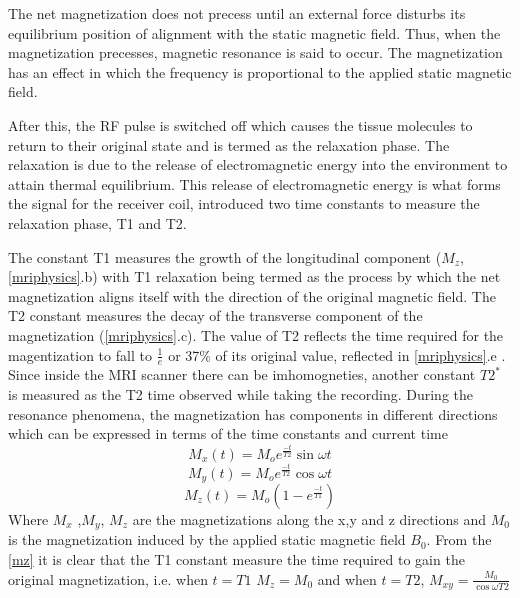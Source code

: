 \documentclass[msthesis.tex]{subfiles}
\begin{document}
The net magnetization does not precess until an external force disturbs its equilibrium position of alignment with the static magnetic field. Thus, when the magnetization precesses, magnetic resonance is said to occur. The magnetization has an effect in which the frequency is proportional to the applied static magnetic field.

After this, the RF pulse is switched off which causes the tissue molecules to return to their original state and is termed as the relaxation phase. The relaxation is due to the release of electromagnetic energy into the environment to attain thermal equilibrium. This release of electromagnetic energy is what forms the signal for the receiver coil, \cite{PhysRev.70.460} introduced two time constants to measure the relaxation phase, T1 and T2.

The constant T1 measures the growth of the longitudinal component ($M_z$, \autoref{mriphysics}.b) with T1 relaxation being termed as the process by which the net magnetization aligns itself with the direction of the original magnetic field. The T2 constant measures the decay of the transverse component of the magnetization (\autoref{mriphysics}.c). The value of T2 reflects the time required for the magentization to fall to $\frac{1}{e}$ or 37\% of its original value, reflected in \autoref{mriphysics}.e . Since inside the MRI scanner there can be imhomogneties, another constant $T2^*$ is measured as the T2 time observed while taking the recording.
During the resonance phenomena, the magnetization has components in different directions which can be expressed in terms of the time constants and current time
\begin{equation}
    M_x(t) = M_o e^{\frac{−t}{T2}} \sin{ \omega t}
    \label{mx}
\end{equation}
\begin{equation}
    M_y(t) = M_o e^{\frac{-t}{T2}} \cos{\omega {t}}
    \label{my}
\end{equation}
\begin{equation}
    M_z(t) = M_o (1 − e^{{\frac{−t}{T1}}})
    \label{mz}
\end{equation}
Where $M_x$ ,$M_y$, $M_z$ are the magnetizations along the x,y and z directions and $M_0$ is the magnetization induced by the applied static magnetic field $B_0$. From the \autoref{mz} it is clear that the T1 constant measure the time required to gain the original magnetization, i.e. when $t=T1$
$M_z = M_0$ and when $t=T2$, $M_{xy} = \frac{M_0}{\cos{\omega T2}}$
\end{document}
